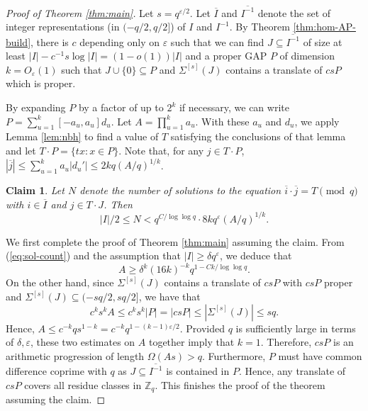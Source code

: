 \documentclass{daj}
\newtheorem{claim}{Claim}
\newcommand{\eps}{\varepsilon}
\newcommand{\bZ}{\mathbb{Z}}
\newcommand{\ol}[1]{\overline{#1}}
\begin{document}
\begin{proof}[Proof of Theorem \ref{thm:main}]
    Let $s=q^{\eps/2}$. Let $\ol{I}$ and $\ol{I^{-1}}$ denote the set of integer representations (in $(-q/2,q/2]$) of $I$ and $I^{-1}$. By Theorem \ref{thm:hom-AP-build}, there is $c$ depending only on $\eps$ such that we can find $J \subseteq \ol{I^{-1}}$ of size at least $|I| - c^{-1} s \log |I| = (1-o(1))|I|$ and a proper GAP $P$ of dimension $k=O_{\eps}(1)$ such that $J \cup \{0\}\subseteq P$ and $\Sigma^{[s]}(J)$ contains a translate of $csP$ which is proper.

    By expanding $P$ by a factor of up to $2^k$ if necessary, we can write $P = \sum_{u=1}^{k} [-a_u,a_u]d_u$. Let $A=\prod_{u=1}^{k} a_u$. With these $a_u$ and $d_u$, we apply Lemma \ref{lem:nbh} to find a value of $T$ satisfying the conclusions of that lemma and let $T\cdot P = \{tx: x\in P\}$. Note that, for any $j\in T\cdot P$, $|\ol{j}| \le \sum_{u=1}^{k} a_u |d_u'| \le 2kq(A/q)^{1/k}$. 

    \begin{claim}
        Let $N$ denote the number of solutions to the equation $\ol{i}\cdot \ol{j} = T \pmod q$ with $i\in \ol{I}$ and $j\in T\cdot J$. Then 
        \begin{equation}\label{eq:sol-count}
            |I|/2\le N < q^{C/\log \log q} \cdot 8kq^{\eps}(A/q)^{1/k}. 
        \end{equation}
    \end{claim}
    We first complete the proof of Theorem \ref{thm:main} assuming the claim. 
    From (\ref{eq:sol-count}) and the assumption that $|I| \geq \delta q^{\eps}$, we deduce that 
    \begin{equation*} 
        A \ge \delta^k (16k)^{-k}q^{1-Ck/\log \log q}.  
    \end{equation*}
    On the other hand, since $\Sigma^{[s]}(J)$ contains a translate of $csP$ with $csP$ proper and $\Sigma^{[s]}(J) \subseteq (-sq/2, sq/2]$, we have that
    \begin{equation*} 
        c^ks^k A \le c^ks^k |P| = |csP| \le |\Sigma^{[s]}(J)| \le sq.
    \end{equation*}
    Hence, $A \le c^{-k}qs^{1-k} = c^{-k}q^{1-(k-1)\eps/2}$. Provided $q$ is sufficiently large in terms of $\delta, \eps$, these two estimates on $A$ together imply that $k=1$. Therefore, $csP$ is an arithmetic progression of length $\Omega(As) > q$. Furthermore, $P$ must have common difference coprime with $q$ as $J \subseteq \ol{I^{-1}}$ is contained in $P$. Hence, any translate of $csP$ covers all residue classes in $\bZ_q$. This finishes the proof of the theorem assuming the claim. 


\end{proof}
\end{document}
